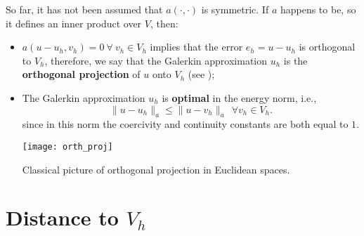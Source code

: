 So far, it has not been assumed that $a(\cdot, \cdot)$ is symmetric.
If $a$ happens to be, so it defines an inner product over $V$, then:

\begin{itemize}
\item $a(u - u_h,v_h) = 0~\forall~v_h \in V_h$ implies that the error $e_h = u-u_h$ is orthogonal to $V_h$,
therefore, we say that the Galerkin approximation $u_h$ is the \textbf{orthogonal projection}
of $u$ onto $V_h$ (see );\\

\item The Galerkin approximation $u_h$ is \textbf{optimal} in the energy norm, i.e.,
\begin{equation}
\lVert u - u_h \rVert_a \le \lVert u-v_h \rVert_a ~~\forall v_h \in V_h.
\end{equation}
since in this norm the coercivity and continuity constants are both equal to $1$.

\begin{marginfigure}[-4.0cm]
	\texttt{[image: orth\_proj]}
	\caption[]{Classical picture of orthogonal projection in Euclidean spaces.}
\end{marginfigure}

\end{itemize}

\section{Distance to $V_h$}

